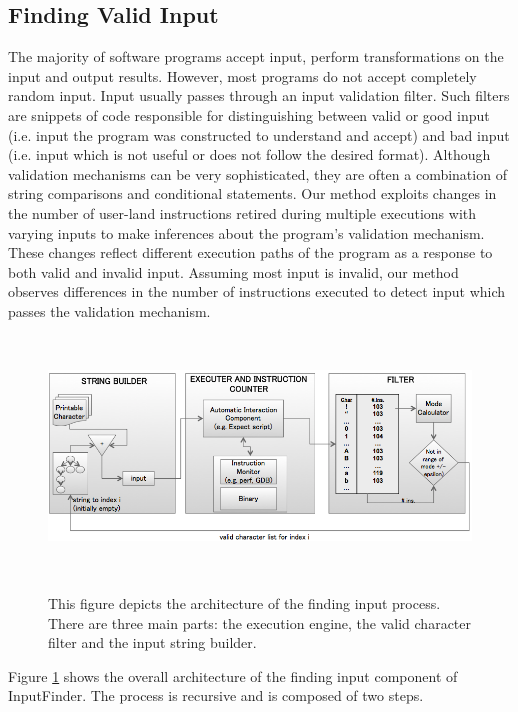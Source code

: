 \documentclass{acm_proc_article-sp}
\def \tool {InputFinder}
\begin{document}
\subsection{Finding Valid Input}
The majority of software programs accept input, perform transformations on the input and output results.
However, most programs do not accept completely random input.
Input usually passes through an input validation filter.
Such filters are snippets of code responsible for distinguishing between valid or good input (i.e. input the program was constructed to understand and accept) and bad input (i.e. input which is not useful or does not follow the desired format).
Although validation mechanisms can be very sophisticated, they are often a combination of string comparisons and conditional statements.
Our method exploits changes in the number of user-land instructions retired during multiple executions with varying inputs to make inferences about the program's validation mechanism.
These changes reflect different execution paths of the program as a response to both valid and invalid input.
Assuming most input is invalid, our method observes differences in the number of instructions executed to detect input which passes the validation mechanism.

\begin{figure}[t]
\centering
\includegraphics[height=2.5in,width=6.5in]{architecture.png}
\label{fig:architecture}
\caption{This figure depicts the architecture of the finding input process. There are three main parts: the execution engine, the valid character filter and the input string builder.}
\end{figure}

Figure \ref{fig:architecture} shows the overall architecture of the finding input component of \tool{}.
The process is recursive and is composed of two steps.
\end{document}
